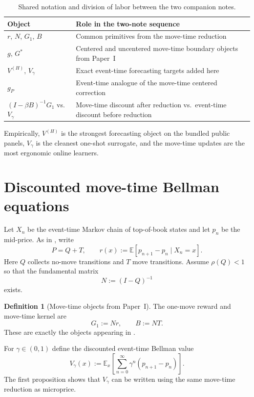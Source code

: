 \documentclass[11pt,twoside]{article}
\theoremstyle{plain}
\theoremstyle{definition}
\newtheorem{definition}[theorem]{Definition}
\theoremstyle{remark}
\newcommand{\1}{\mathbf{1}}
\newcommand{\E}{\mathbb{E}}
\begin{document}
\begin{table}[t]
\centering
\small
\begin{tabular}{@{}p{3.6cm}p{8.1cm}@{}}
\toprule
Object & Role in the two-note sequence \\
\midrule
$r$, $N$, $G_1$, $B$ & Common primitives from the move-time reduction \\
$g$, $G^*$ & Centered and uncentered move-time boundary objects from Paper~I \\
$V^{(H)}$, $V_\gamma$ & Exact event-time forecasting targets added here \\
$g_P$ & Event-time analogue of the move-time centered correction \\
$(I-\beta B)^{-1}G_1$ vs.\ $V_\gamma$ & Move-time discount after reduction vs.\ event-time discount before reduction \\
\bottomrule
\end{tabular}
\caption{Shared notation and division of labor between the two companion notes.}
\label{tab:paper_map}
\end{table}

Empirically, $V^{(H)}$ is the strongest forecasting object on the bundled public panels, $V_\gamma$ is the cleanest one-shot surrogate, and the move-time updates are the most ergonomic online learners.

\section{Discounted move-time Bellman equations}

Let $X_n$ be the event-time Markov chain of top-of-book states and let $p_n$ be the mid-price. As in \cite{Petersen2025}, write
\[
P=Q+T,
\qquad
r(x):=\E[p_{n+1}-p_n\mid X_n=x].
\]
Here $Q$ collects no-move transitions and $T$ move transitions. Assume $\rho(Q)<1$ so that the fundamental matrix
\[
N:=(I-Q)^{-1}
\]
exists.

\begin{definition}[Move-time objects from Paper~I]
The one-move reward and move-time kernel are
\[
G_1:=Nr,
\qquad
B:=NT.
\]
These are exactly the objects appearing in \cite{Petersen2025}.
\end{definition}

For $\gamma\in(0,1)$ define the discounted event-time Bellman value
\begin{equation}\label{eq:discounted_event_value}
V_\gamma(x):=\E_x\!\left[\sum_{n=0}^{\infty}\gamma^n(p_{n+1}-p_n)\right].
\end{equation}
The first proposition shows that $V_\gamma$ can be written using the same move-time reduction as microprice.
\end{document}

